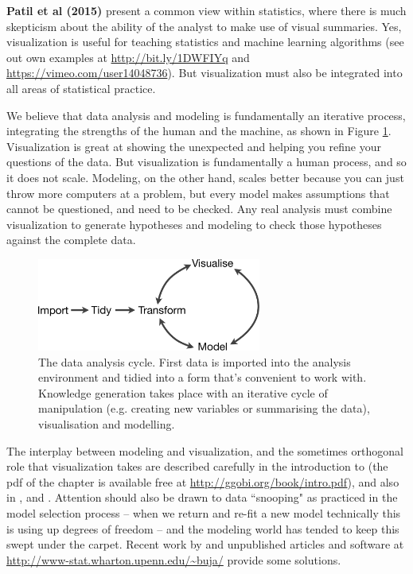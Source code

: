 \documentclass[preprint]{imsart}
\begin{document}

\textbf{Patil et al (2015)} present a common view within statistics, where there is much skepticism about the ability of the analyst to make use of visual summaries. Yes, visualization is useful for teaching statistics and machine learning algorithms (see out own examples at \url{http://bit.ly/1DWFIYq} and \url{https://vimeo.com/user14048736}). But visualization must also be integrated into all areas of statistical practice.

We believe that data analysis and modeling is fundamentally an iterative process, integrating the strengths of the human and the machine, as shown in Figure \ref{fig:cycle}. Visualization is great at showing the unexpected and helping you refine your questions of the data. But visualization is fundamentally a human process, and so it does not scale. Modeling, on the other hand, scales better because you can just throw more computers at a problem, but every model makes assumptions that cannot be questioned, and need to be checked. Any real analysis must combine visualization to generate hypotheses and modeling to check those hypotheses against the complete data.

\begin{figure}[htbp]
  \centering
  \includegraphics[height=1.2in]{cycle-crop}
  \caption{The data analysis cycle. First data is imported into the analysis environment and tidied into a form that's convenient to work with. Knowledge generation takes place with an iterative cycle of manipulation (e.g. creating new variables or summarising the data), visualisation and modelling.}
  \label{fig:cycle}
\end{figure}

The interplay between modeling and visualization, and the sometimes orthogonal role that visualization takes are described carefully in the introduction to \cite{cook:2007} (the pdf of the chapter is available free at \url{http://ggobi.org/book/intro.pdf}), and also in \cite{Ch95}, and \cite{CH90}. Attention should also be drawn to data ``snooping" as practiced in the model selection process -- when we return and re-fit a new model technically this is using up degrees of freedom -- and the modeling world has tended to keep this swept under the carpet. Recent work by \cite{berk:2013} and unpublished articles and software at \url{http://www-stat.wharton.upenn.edu/~buja/} provide some solutions.
\end{document}
